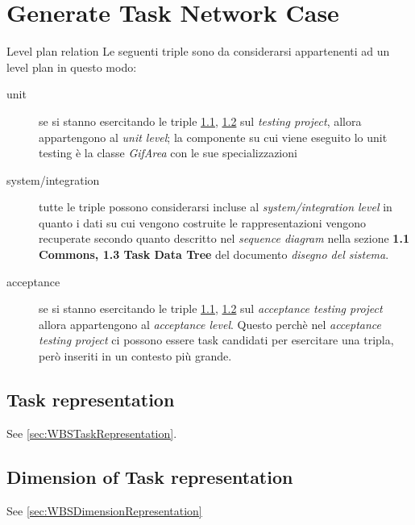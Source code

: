 \chapter{Generate Task Network Case}
\label{chap:generateTaskNetwork}

\begin{paragraph}{Level plan relation}
Le seguenti triple sono da considerarsi appartenenti ad un level plan in questo
modo:
\begin{description}
\item[unit] se si stanno esercitando le triple
\ref{sec:TNTaskRepresentation},  \ref{sec:dimensionTaskRepresentation} sul
\emph{testing project}, allora appartengono al \emph{unit level};  la
componente su cui viene eseguito lo unit testing \`e la classe  \emph{GifArea}
con le sue specializzazioni
  \item[system/integration] tutte le triple possono considerarsi incluse al
  \emph{system/integration level} in quanto i dati su cui vengono costruite le
  rappresentazioni vengono recuperate secondo quanto descritto nel
  \emph{sequence diagram} nella sezione \textbf{1.1 Commons, 1.3 Task Data Tree}
  del documento \emph{disegno del sistema}.
  \item[acceptance] se si stanno esercitando le triple
  \ref{sec:TNTaskRepresentation},  \ref{sec:dimensionTaskRepresentation} sul 
  \emph{acceptance testing project} allora appartengono al  \emph{acceptance
  level}. Questo perch\`e nel \emph{acceptance testing project} ci possono 
  essere task candidati per esercitare una tripla, per\`o inseriti in un 
  contesto pi\`u grande.
\end{description}
\end{paragraph}

\section{Task representation}
\label{sec:TNTaskRepresentation}
See \ref{sec:WBSTaskRepresentation}.

\section{Dimension of Task representation}
\label{sec:dimensionTaskRepresentation}
See \ref{sec:WBSDimensionRepresentation}

